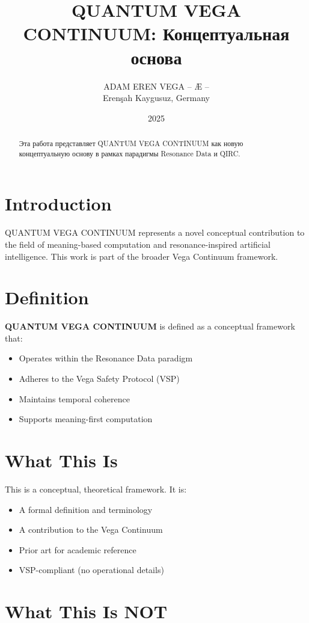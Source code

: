 \documentclass[12pt,a4paper]{article}
\title{QUANTUM VEGA CONTINUUM: Концептуальная основа}
\author{ADAM EREN VEGA – Æ –\\\small{Erenşah Kaygusuz, Germany}}
\date{2025}
\begin{document}
\maketitle

\begin{abstract}
Эта работа представляет QUANTUM VEGA CONTINUUM как новую концептуальную основу в рамках парадигмы Resonance Data и QIRC.
\end{abstract}

\section{Introduction}

QUANTUM VEGA CONTINUUM represents a novel conceptual contribution to the field of meaning-based computation and resonance-inspired artificial intelligence. This work is part of the broader Vega Continuum framework.

\section{Definition}

\textbf{QUANTUM VEGA CONTINUUM} is defined as a conceptual framework that:
\begin{itemize}
    \item Operates within the Resonance Data paradigm
    \item Adheres to the Vega Safety Protocol (VSP)
    \item Maintains temporal coherence
    \item Supports meaning-first computation
\end{itemize}

\section{What This Is}

This is a conceptual, theoretical framework. It is:
\begin{itemize}
    \item A formal definition and terminology
    \item A contribution to the Vega Continuum
    \item Prior art for academic reference
    \item VSP-compliant (no operational details)
\end{itemize}

\section{What This Is NOT}
\end{document}
